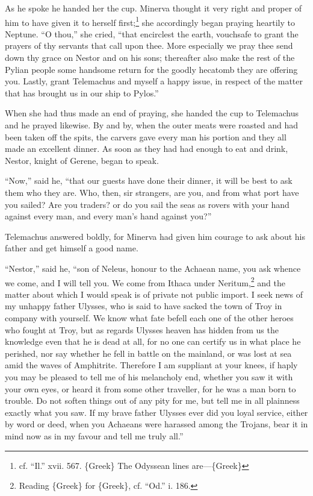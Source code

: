 As he spoke he handed her the cup. Minerva thought it very right and proper of
him to have given it to herself first;\footnote{cf. “Il.” xvii. 567. \{Greek\} The Odyssean lines are—\{Greek\}} she accordingly began praying
heartily to Neptune. “O thou,” she cried, “that encirclest the earth, vouchsafe
to grant the prayers of thy servants that call upon thee. More especially we
pray thee send down thy grace on Nestor and on his sons; thereafter also make
the rest of the Pylian people some handsome return for the goodly hecatomb they
are offering you. Lastly, grant Telemachus and myself a happy issue, in respect
of the matter that has brought us in our ship to Pylos.”

When she had thus made an end of praying, she handed the cup to Telemachus and
he prayed likewise. By and by, when the outer meats were roasted and had been
taken off the spits, the carvers gave every man his portion and they all made
an excellent dinner. As soon as they had had enough to eat and drink, Nestor,
knight of Gerene, began to speak.

“Now,” said he, “that our guests have done their dinner, it will be best to ask
them who they are. Who, then, sir strangers, are you, and from what port have
you sailed? Are you traders? or do you sail the seas as rovers with your hand
against every man, and every man’s hand against you?”

Telemachus answered boldly, for Minerva had given him courage to ask about his
father and get himself a good name.

“Nestor,” said he, “son of Neleus, honour to the Achaean name, you ask whence
we come, and I will tell you. We come from Ithaca under Neritum,\footnote{Reading \{Greek\} for \{Greek\}, cf. “Od.” i. 186.} and the matter
about which I would speak is of private not public import. I seek news of my
unhappy father Ulysses, who is said to have sacked the town of Troy in company
with yourself. We know what fate befell each one of the other heroes who fought
at Troy, but as regards Ulysses heaven has hidden from us the knowledge even
that he is dead at all, for no one can certify us in what place he perished,
nor say whether he fell in battle on the mainland, or was lost at sea amid the
waves of Amphitrite. Therefore I am suppliant at your knees, if haply you may
be pleased to tell me of his melancholy end, whether you saw it with your own
eyes, or heard it from some other traveller, for he was a man born to trouble.
Do not soften things out of any pity for me, but tell me in all plainness
exactly what you saw. If my brave father Ulysses ever did you loyal service,
either by word or deed, when you Achaeans were harassed among the Trojans, bear
it in mind now as in my favour and tell me truly all.”

